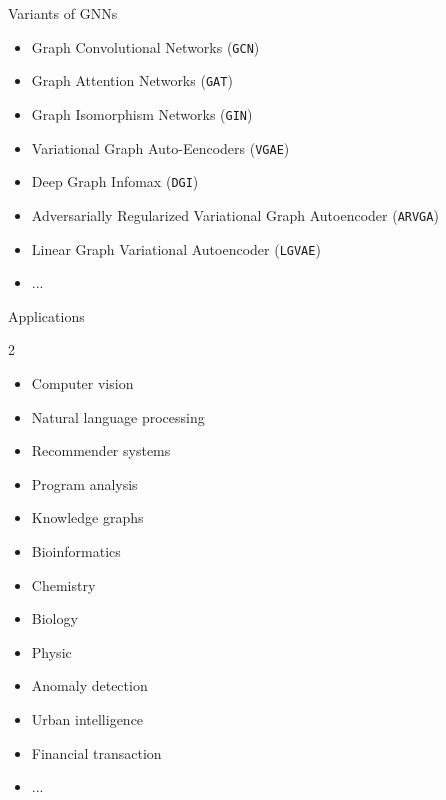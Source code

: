 \documentclass{beamer}
\begin{document}
    \begin{frame}{Variants of GNNs}
        \begin{itemize}
            \item Graph Convolutional Networks (\texttt{GCN}) %
            \item Graph Attention Networks (\texttt{GAT}) %
            \item Graph Isomorphism Networks (\texttt{GIN}) %
            
            \item Variational Graph Auto-Eencoders (\texttt{VGAE}) %
            \item Deep Graph Infomax (\texttt{DGI}) %
            \item Adversarially Regularized Variational Graph Autoencoder (\texttt{ARVGA}) %
            \item Linear Graph Variational Autoencoder (\texttt{LGVAE}) %
            \item ...
        \end{itemize}
    \end{frame}
    
    \begin{frame}{Applications}
        \begin{multicols}{2}
            \begin{itemize}
                \item Computer vision
                \item Natural language processing
                \item Recommender systems
                \item Program analysis
                \item Knowledge graphs
                \item Bioinformatics
                \item Chemistry
                \item Biology
                \item Physic
                \item Anomaly detection
                \item Urban intelligence
                \item Financial transaction
                \item ...
            \end{itemize}
        \end{multicols}          
    \end{frame}
\end{document}
